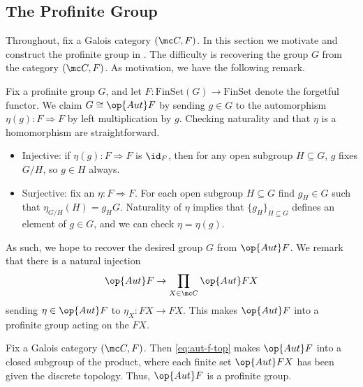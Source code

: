 \documentclass{amsart}
\begin{document}
\subsection{The Profinite Group}
Throughout, fix a Galois category $(\mc C,F)$. In this section we motivate and construct the profinite group in . The difficulty is recovering the group $G$ from the category $(\mc C,F)$. As motivation, we have the following remark.
\begin{remark}
    Fix a profinite group $G$, and let $F\colon\mathrm{FinSet}(G)\to\mathrm{FinSet}$ denote the forgetful functor. We claim $G\cong\op{Aut}F$ by sending $g\in G$ to the automorphism $\eta(g)\colon F\Rightarrow F$ by left multiplication by $g$. Checking naturality and that $\eta$ is a homomorphism are straightforward.
    \begin{itemize}
        \item Injective: if $\eta(g)\colon F\Rightarrow F$ is $\id_F$, then for any open subgroup $H\subseteq G$, $g$ fixes $G/H$, so $g\in H$ always.
        \item Surjective: fix an $\eta\colon F\Rightarrow F$. For each open subgroup $H\subseteq G$ find $g_H\in G$ such that $\eta_{G/H}(H)=g_HG$. Naturality of $\eta$ implies that $\{g_H\}_{H\subseteq G}$ defines an element of $g\in G$, and we can check $\eta=\eta(g)$.
    \end{itemize}
\end{remark}
As such, we hope to recover the desired group $G$ from $\op{Aut}F$. We remark that there is a natural injection
\begin{equation}
    \op{Aut}F\to\prod_{X\in\mc C}\op{Aut}FX \label{eq:aut-f-top}
\end{equation}
sending $\eta\in\op{Aut}F$ to $\eta_X\colon FX\to FX$. This makes $\op{Aut}F$ into a profinite group acting on the $FX$.
\begin{lemma}
    Fix a Galois category $(\mc C,F)$. Then \eqref{eq:aut-f-top} makes $\op{Aut}F$ into a closed subgroup of the product, where each finite set $\op{Aut}FX$ has been given the discrete topology. Thus, $\op{Aut}F$ is a profinite group.
\end{lemma}
\end{document}
